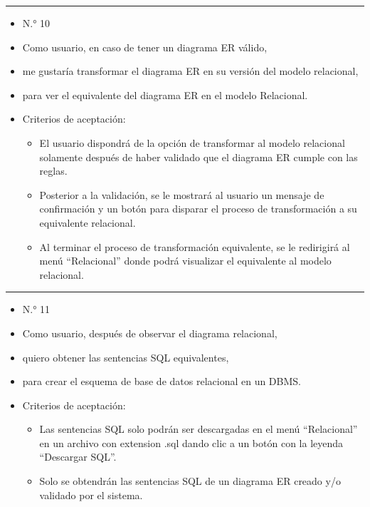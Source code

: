 \noindent\rule{\textwidth}{1pt}
\begin{itemize}
	\item N.° 10
	\item Como usuario, en caso de tener un diagrama ER válido,
	\item me gustaría transformar el diagrama ER en su versión del modelo relacional,
	\item para ver el equivalente del diagrama ER en el modelo Relacional.
	\item Criterios de aceptación:
	\begin{itemize}
		\item El usuario dispondrá de la opción de transformar al modelo relacional solamente después de haber validado que el diagrama ER cumple con las reglas.
		\item Posterior a la validación, se le mostrará al usuario un mensaje de confirmación y un botón para disparar el proceso de transformación a su equivalente relacional.
		\item Al terminar el proceso de transformación equivalente, se le redirigirá al menú ``Relacional'' donde podrá visualizar el equivalente al modelo relacional.
	\end{itemize}
\end{itemize}
\noindent\rule{\textwidth}{1pt}
\begin{itemize}
	\item N.° 11
	\item Como usuario, después de observar el diagrama relacional,
	\item quiero obtener las sentencias SQL equivalentes,
	\item para crear el esquema de base de datos relacional en un DBMS.
	\item Criterios de aceptación:
	\begin{itemize}
		\item Las sentencias SQL solo podrán ser descargadas en el menú ``Relacional'' en un archivo con extension .sql dando clic a un botón con la leyenda ``Descargar SQL''.
		\item Solo se obtendrán las sentencias SQL de un diagrama ER creado y/o validado por el sistema.
	\end{itemize}
\end{itemize}
